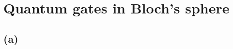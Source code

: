 \documentclass{_mypackages/monograph}
\begin{document}
\chapter{Quantum gates in Bloch’s sphere}

\section{(a)}

\end{document}
